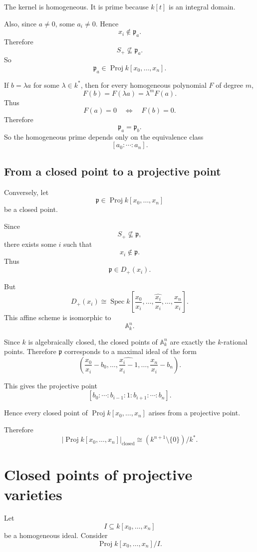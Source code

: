 \documentclass[12pt,a4paper]{article}
\DeclareMathOperator{\Spec}{Spec}
\DeclareMathOperator{\Proj}{Proj}
\theoremstyle{notespace}
\begin{document}
The kernel is homogeneous. It is prime because \(k[t]\) is an integral domain.

Also, since \(a\neq 0\), some \(a_i\neq 0\). Hence
\[
x_i\notin \mathfrak p_a.
\]
Therefore
\[
S_+\not\subseteq \mathfrak p_a.
\]
So
\[
\mathfrak p_a\in \Proj k[x_0,\dots,x_n].
\]

If \(b=\lambda a\) for some \(\lambda\in k^*\), then for every homogeneous polynomial
\(F\) of degree \(m\),
\[
F(b)=F(\lambda a)=\lambda^m F(a).
\]
Thus
\[
F(a)=0
\quad\Longleftrightarrow\quad
F(b)=0.
\]
Therefore
\[
\mathfrak p_a=\mathfrak p_b.
\]
So the homogeneous prime depends only on the equivalence class
\[
[a_0:\cdots:a_n].
\]

\subsection{From a closed point to a projective point}

Conversely, let
\[
\mathfrak p\in \Proj k[x_0,\dots,x_n]
\]
be a closed point.

Since
\[
S_+\not\subseteq \mathfrak p,
\]
there exists some \(i\) such that
\[
x_i\notin \mathfrak p.
\]
Thus
\[
\mathfrak p\in D_+(x_i).
\]

But
\[
D_+(x_i)
\cong
\Spec k\left[
\frac{x_0}{x_i},
\dots,
\widehat{\frac{x_i}{x_i}},
\dots,
\frac{x_n}{x_i}
\right].
\]
This affine scheme is isomorphic to
\[
\mathbb A_k^n.
\]

Since \(k\) is algebraically closed, the closed points of \(\mathbb A_k^n\) are exactly
the \(k\)-rational points. Therefore \(\mathfrak p\) corresponds to a maximal ideal of
the form
\[
\left(
\frac{x_0}{x_i}-b_0,
\dots,
\widehat{\frac{x_i}{x_i}-1},
\dots,
\frac{x_n}{x_i}-b_n
\right).
\]

This gives the projective point
\[
[b_0:\cdots:b_{i-1}:1:b_{i+1}:\cdots:b_n].
\]

Hence every closed point of \(\Proj k[x_0,\dots,x_n]\) arises from a projective point.

Therefore
\[
\boxed{
	\left|\Proj k[x_0,\dots,x_n]\right|_{\mathrm{closed}}
	\cong
	(k^{n+1}\setminus\{0\})/k^*.
}
\]

\section{Closed points of projective varieties}

Let
\[
I\subseteq k[x_0,\dots,x_n]
\]
be a homogeneous ideal. Consider
\[
\Proj k[x_0,\dots,x_n]/I.
\]
\end{document}
